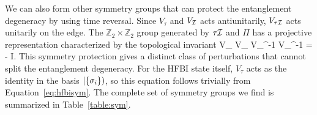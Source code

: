 

We can also form other symmetry groups that can protect the entanglement degeneracy by using
time reversal. 
Since $V_{\tau}$ and $V_{\mathcal{I}}$ acts antiunitarily, $V_{\tau \mathcal{I}}$ acts
unitarily on the edge. The $\mathbb{Z}_2 \times \mathbb{Z}_2$ group generated by
$\tau \mathcal{I}$ and $\varPi$ has a projective representation characterized by the 
topological invariant
\beq
V_{\varPi} V_{\tau \I} V_{\varPi}^{-1} V_{\tau \I}^{-1}
 = - I.
\eeq
This symmetry protection gives a distinct class of perturbations that cannot
split the entanglement degeneracy. For the HFBI state itself, $V_{\tau}$ acts as the identity in 
the basis $\left |\{\sigma_i\} \right )$, so this equation follows trivially from 
Equation~\ref{eq:hfbisym}. 
The complete set of symmetry groups we find is summarized in Table~\ref{table:sym}.


